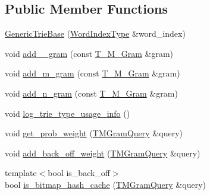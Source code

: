 \subsection*{Public Member Functions}
\begin{DoxyCompactItemize}
\item 
\hyperlink{classuva_1_1smt_1_1tries_1_1_generic_trie_base_a2eb30c9752298f2a21dfb784e555f42f}{Generic\+Trie\+Base} (\hyperlink{classuva_1_1smt_1_1tries_1_1_word_index_trie_base_a30c4fffe3a3423c87b229b66340dd2f8}{Word\+Index\+Type} \&word\+\_\+index)
\item 
void \hyperlink{classuva_1_1smt_1_1tries_1_1_generic_trie_base_a5ef975917eef978d1f9a18da33186cb0}{add\+\_\+\_\+gram} (const \hyperlink{structuva_1_1smt_1_1tries_1_1mgrams_1_1_t___m___gram}{T\+\_\+\+M\+\_\+\+Gram} \&gram)
\item 
void \hyperlink{classuva_1_1smt_1_1tries_1_1_generic_trie_base_aeff4e2102253aa77bc234d728b3e419a}{add\+\_\+m\+\_\+gram} (const \hyperlink{structuva_1_1smt_1_1tries_1_1mgrams_1_1_t___m___gram}{T\+\_\+\+M\+\_\+\+Gram} \&gram)
\item 
void \hyperlink{classuva_1_1smt_1_1tries_1_1_generic_trie_base_a5f72dfc15790337083cdcf9dde5a57bd}{add\+\_\+n\+\_\+gram} (const \hyperlink{structuva_1_1smt_1_1tries_1_1mgrams_1_1_t___m___gram}{T\+\_\+\+M\+\_\+\+Gram} \&gram)
\item 
void \hyperlink{classuva_1_1smt_1_1tries_1_1_generic_trie_base_ae99e6dea813c6fef8da774be4eb51da8}{log\+\_\+trie\+\_\+type\+\_\+usage\+\_\+info} ()
\item 
void \hyperlink{classuva_1_1smt_1_1tries_1_1_generic_trie_base_a030ba825a3e589452db76eb55bcce8a3}{get\+\_\+prob\+\_\+weight} (\hyperlink{classuva_1_1smt_1_1tries_1_1_generic_trie_base_a53a71f408bedf42ba24a566842bf3785}{T\+M\+Gram\+Query} \&query)
\item 
void \hyperlink{classuva_1_1smt_1_1tries_1_1_generic_trie_base_aad82b414bec49b6b8aaab24d04422345}{add\+\_\+back\+\_\+off\+\_\+weight} (\hyperlink{classuva_1_1smt_1_1tries_1_1_generic_trie_base_a53a71f408bedf42ba24a566842bf3785}{T\+M\+Gram\+Query} \&query)
\item 
{\footnotesize template$<$bool is\+\_\+back\+\_\+off$>$ }\\bool \hyperlink{classuva_1_1smt_1_1tries_1_1_generic_trie_base_adff6c3a43e05e9279a79fa6165778ba0}{is\+\_\+bitmap\+\_\+hash\+\_\+cache} (\hyperlink{classuva_1_1smt_1_1tries_1_1_generic_trie_base_a53a71f408bedf42ba24a566842bf3785}{T\+M\+Gram\+Query} \&query)
\end{DoxyCompactItemize}
